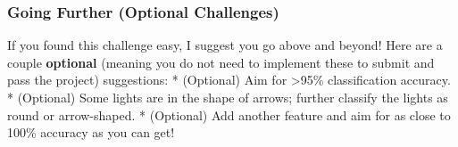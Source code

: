 \documentclass[11pt]{article}
\begin{document}
    \hypertarget{going-further-optional-challenges}{%
\subsubsection{Going Further (Optional
Challenges)}\label{going-further-optional-challenges}}

If you found this challenge easy, I suggest you go above and beyond!
Here are a couple \textbf{optional} (meaning you do not need to
implement these to submit and pass the project) suggestions: *
(Optional) Aim for \textgreater{}95\% classification accuracy. *
(Optional) Some lights are in the shape of arrows; further classify the
lights as round or arrow-shaped. * (Optional) Add another feature and
aim for as close to 100\% accuracy as you can get!


    
    
    
    
\end{document}
